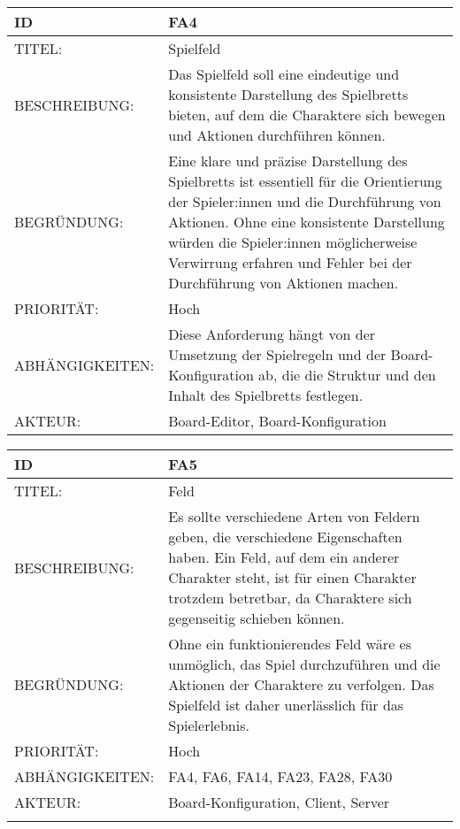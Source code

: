 \documentclass{uulm-assignment}
\begin{document}
    \begin{tabularx}{\textwidth}{|l|X |} \hline
        \textbf{ID} & \textbf{FA4} \\
        \hline
        TITEL: & Spielfeld \\
        \hline
        BESCHREIBUNG: & Das Spielfeld soll eine eindeutige und konsistente Darstellung des Spielbretts bieten, auf dem die Charaktere sich bewegen und Aktionen durchführen können.
        \\
        \hline
        BEGRÜNDUNG: & Eine klare und präzise Darstellung des Spielbretts ist essentiell für die Orientierung der Spieler:innen und die Durchführung von Aktionen. Ohne eine konsistente Darstellung würden die Spieler:innen möglicherweise Verwirrung erfahren und Fehler bei der Durchführung von Aktionen machen. \\
        \hline
        PRIORITÄT: & Hoch\\
        \hline
        ABHÄNGIGKEITEN: & Diese Anforderung hängt von der Umsetzung der Spielregeln und der Board-Konfiguration ab, die die Struktur und den Inhalt des Spielbretts festlegen.\\
        \hline
        AKTEUR: & Board-Editor, Board-Konfiguration
        \\
        \hline
    \end{tabularx}
    
    \begin{tabularx}{\textwidth}{|l|X |} \hline
        \textbf{ID} & \textbf{FA5} \\
        \hline
        TITEL: &  Feld\\
        \hline
        BESCHREIBUNG: & Es sollte verschiedene Arten von Feldern geben, die verschiedene Eigenschaften haben. Ein Feld, auf dem ein anderer Charakter steht, ist für einen Charakter trotzdem betretbar, da Charaktere sich gegenseitig schieben können. 
        \\
        \hline
        BEGRÜNDUNG: & Ohne ein funktionierendes Feld  wäre es unmöglich, das Spiel durchzuführen und die Aktionen der Charaktere zu verfolgen. Das Spielfeld ist daher unerlässlich für das Spielerlebnis. \\
        \hline
        PRIORITÄT: & Hoch\\
        \hline
        ABHÄNGIGKEITEN: & FA4, FA6, FA14, FA23, FA28, FA30\\
        \hline
        AKTEUR: & Board-Konfiguration, Client, Server \\
        \\
        \hline
    \end{tabularx}
\end{document}

